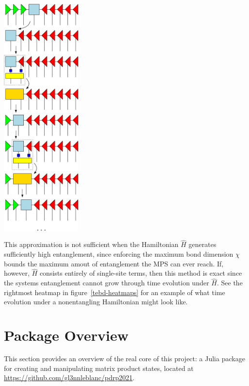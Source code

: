 \documentclass[12pt]{article}
\newenvironment{Figure}
  {\par\medskip\noindent\minipage{\linewidth}}
  {\endminipage\par\medskip}
\begin{document}
\begin{multicols}{2}
	\begin{Figure}
		\center\includegraphics[height=350pt]{./Figures/tebd.eps}
		\label{TEBD}
	\end{Figure}

	This approximation is not sufficient when the Hamiltonian $\hat{H}$
	generates sufficiently high entanglement, since enforcing the
	maximum bond dimension $\chi$ bounds the maximum amout of
	entanglement the MPS can ever reach. If, however, $\hat{H}$ consists
	entirely of single-site terms, then this method is exact since the
	systems entanglement cannot grow through time evolution under
	$\hat{H}$. See the rightmost heatmap in figure~\ref{tebd-heatmaps}
	for an example of what time evolution under a nonentangling
	Hamiltonian might look like.


\section*{Package Overview}
	This section provides an overview of the real core of this project: a
	Julia package for creating and manipulating matrix
	product states, located at~\\
	\url{https://github.com/gl3nnleblanc/pdrp2021}.

\end{multicols}
\end{document}
